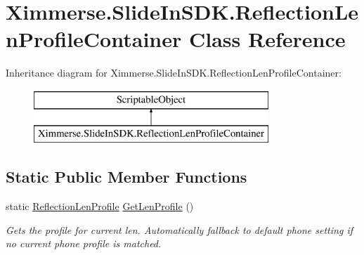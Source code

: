 \hypertarget{class_ximmerse_1_1_slide_in_s_d_k_1_1_reflection_len_profile_container}{}\section{Ximmerse.\+Slide\+In\+S\+D\+K.\+Reflection\+Len\+Profile\+Container Class Reference}
\label{class_ximmerse_1_1_slide_in_s_d_k_1_1_reflection_len_profile_container}
Inheritance diagram for Ximmerse.\+Slide\+In\+S\+D\+K.\+Reflection\+Len\+Profile\+Container\+:\begin{figure}[H]
\begin{center}
\leavevmode
\includegraphics[height=2.000000cm]{class_ximmerse_1_1_slide_in_s_d_k_1_1_reflection_len_profile_container}
\end{center}
\end{figure}
\subsection*{Static Public Member Functions}
\begin{DoxyCompactItemize}
\item 
static \mbox{\hyperlink{class_ximmerse_1_1_slide_in_s_d_k_1_1_reflection_len_profile}{Reflection\+Len\+Profile}} \mbox{\hyperlink{class_ximmerse_1_1_slide_in_s_d_k_1_1_reflection_len_profile_container_ada58fecfd6bb0f58f689c110d47920b4}{Get\+Len\+Profile}} ()
\begin{DoxyCompactList}\small\item\em Gets the profile for current len. Automatically fallback to default phone setting if no current phone profile is matched. \end{DoxyCompactList}\end{DoxyCompactItemize}
